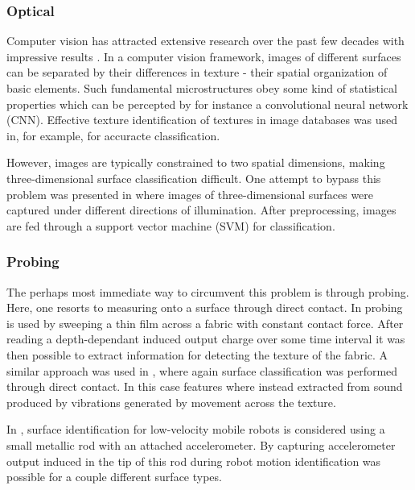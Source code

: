 \subsubsection{Optical}

Computer vision has attracted extensive research over the past few decades with impressive results \citep{liu_chen_fieguth_zhao_chellappa_pietikäinen_2018}. In a computer vision framework, images of different surfaces can be separated by their differences in texture - their spatial organization of basic elements. Such fundamental microstructures obey some kind of statistical properties which can be percepted by for instance a convolutional neural network (CNN). Effective texture identification of textures in image databases was used in, for example, \citep{do_vetterli_2002} for accuracte classification.

However, images are typically constrained to two spatial dimensions, making three-dimensional surface classification difficult. One attempt to bypass this problem was presented in  \citep{dong_duan_yang_2008} where images of three-dimensional surfaces were captured under different directions of illumination. After preprocessing, images are fed through a support vector machine (SVM) for classification. 

\subsubsection{Probing}

The perhaps most immediate way to circumvent this problem is through probing. Here, one resorts to measuring onto a surface through direct contact. In \citep{song_han_hu_li_2014} probing is used by sweeping a thin film across a fabric with constant contact force. After reading a depth-dependant induced output charge over some time interval it was then possible to extract information for detecting the texture of the fabric. A similar approach was used in \citep{strese_schuwerk_iepure_steinbach_2017}, where again surface classification was performed through direct contact. In this case features where instead extracted from sound produced by vibrations generated by movement across the texture. 

In \citep{giguere_dudek_2011}, surface identification for low-velocity mobile robots is considered using a small metallic rod with an attached accelerometer. By capturing accelerometer output induced in the tip of this rod during robot motion identification was possible for a couple different surface types. 

